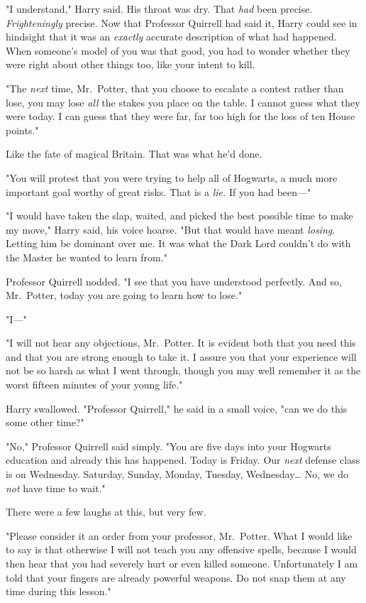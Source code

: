 "I understand," Harry said. His throat was dry. That \emph{had} been precise.
\emph{Frighteningly} precise. Now that Professor Quirrell had said it, Harry
could see in hindsight that it was an \emph{exactly} accurate description of
what had happened. When someone's model of you was that good, you had to wonder
whether they were right about other things too, like your intent to kill.

"The \emph{next} time, Mr.~Potter, that you choose to escalate a contest rather
than lose, you may lose \emph{all} the stakes you place on the table. I cannot
guess what they were today. I can guess that they were far, far too high for
the loss of ten House points."

Like the fate of magical Britain. That was what he'd done.

"You will protest that you were trying to help all of Hogwarts, a much more
important goal worthy of great risks. That is a \emph{lie.} If you had been---"

"I would have taken the slap, waited, and picked the best possible time to make
my move," Harry said, his voice hoarse. "But that would have meant
\emph{losing}. Letting him be dominant over me. It was what the Dark Lord
couldn't do with the Master he wanted to learn from."

Professor Quirrell nodded. "I see that you have understood perfectly. And so,
Mr.~Potter, today you are going to learn how to lose."

"I---"

"I will not hear any objections, Mr.~Potter. It is evident both that you need
this and that you are strong enough to take it. I assure you that your
experience will not be so harsh as what I went through, though you may well
remember it as the worst fifteen minutes of your young life."

Harry swallowed. "Professor Quirrell," he said in a small voice, "can we do
this some other time?"

"No," Professor Quirrell said simply. "You are five days into your Hogwarts
education and already this has happened. Today is Friday. Our \emph{next}
defense class is on Wednesday. Saturday, Sunday, Monday, Tuesday,
Wednesday{\ldots} No, we do \emph{not} have time to wait."

There were a few laughs at this, but very few.

"Please consider it an order from your professor, Mr.~Potter. What I would like
to say is that otherwise I will not teach you any offensive spells, because I
would then hear that you had severely hurt or even killed someone.
Unfortunately I am told that your fingers are already powerful weapons. Do not
snap them at any time during this lesson."

